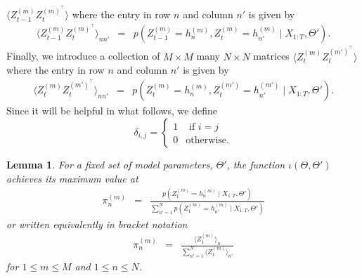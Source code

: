 \documentclass{amsart}
\newtheorem{lemma}[theorem]{Lemma}
\begin{document}
$\langle Z_{t-1}^{(m)}Z_t^{(m)^\intercal}\rangle$ 
where the entry in row $n$ and column $n'$ is given by 
\begin{eqnarray*}
\langle Z_{t-1}^{(m)}Z_t^{(m)^\intercal}\rangle_{nn'} &=& 
p\left(Z_{t-1}^{(m)}=h_n^{(m)},Z_t^{(m)}=h_{n'}^{(m)}\mid 
X_{1:T},\Theta'\right).
\end{eqnarray*}
Finally, we introduce a collection of $M\times M$ many $N\times N$ 
matrices $\langle 
Z_t^{(m)}Z_t^{(m')^\intercal} \rangle$ where the entry in row $n$ and column $n'$ is 
given by  
\begin{eqnarray*}
\langle Z_t^{(m)}Z_t^{(m')^\intercal}\rangle_{nn'} &=& 
p\left(Z_t^{(m)}=h_n^{(m)},Z_t^{(m')}=h_{n'}^{(m')}\mid 
X_{1:T},\Theta'\right).
\end{eqnarray*}
Since it will be helpful in what follows, we define 
\[
\delta_{i,j}=\begin{cases}
1 & \text{ if }i=j\\
0 & \text{otherwise}.
\end{cases}
\]


\begin{lemma}\label{lemma:initial}
For a fixed set of model parameters, $\Theta'$, the function $\iota(\Theta,\Theta')$ achieves its maximum value at
\begin{eqnarray*}
\pi_n^{(m)} &=& \frac{p(Z_1^{(m)} = h_n^{(m)}\mid 
X_{1:T},\Theta')}{\sum_{n'=1}^Np(Z_1^{(m)} = h_{n'}^{(m)}\mid 
X_{1:T},\Theta')}
\end{eqnarray*}
or written equivalently in bracket notation
\begin{eqnarray}\label{eqn:updateinitial}
\pi_n^{(m)} &=&\frac{\langle Z_1^{(m)}\rangle_n}{\sum_{n'=1}^N\langle 
Z_1^{(m)}\rangle_{n'}}
\end{eqnarray}
for $1\leq m\leq M$ and $1\leq n\leq N$.
\end{lemma}
\end{document}
